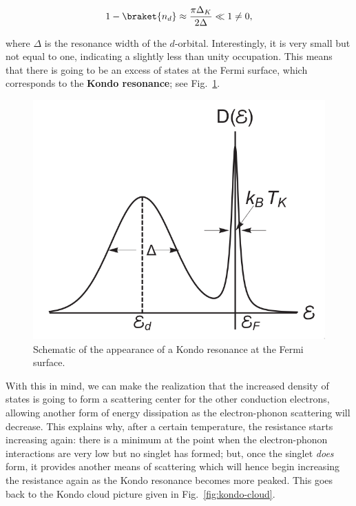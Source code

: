 \begin{equation}
  1 - \braket{n_d} \approx \frac{\pi \Delta_K}{2\Delta} \ll 1 \neq 0,
\end{equation}

where $\Delta$ is the resonance width of the $d$-orbital. Interestingly, it is very small but not equal to one, indicating a slightly less than unity occupation. This means that there is going to be an excess of states at the Fermi surface, which corresponds to the \textbf{Kondo resonance}; see Fig.~\ref{fig:3-variational-kondoresonance}.

\begin{figure}[ht]
  \centering
  \includegraphics[width=0.5\linewidth]{./gfx/kondo-resonance.png}
  \caption{Schematic of the appearance of a Kondo resonance at the Fermi surface.}
  \label{fig:3-variational-kondoresonance}
\end{figure}

With this in mind, we can make the realization that the increased density of states is going to form a scattering center for the other conduction electrons, allowing another form of energy dissipation as the electron-phonon scattering will decrease. This explains why, after a certain temperature, the resistance starts increasing again: there is a minimum at the point when the electron-phonon interactions are very low but no singlet has formed; but, once the singlet \textit{does} form, it provides another means of scattering which will hence begin increasing the resistance again as the Kondo resonance becomes more peaked. This goes back to the Kondo cloud picture given in Fig.~\ref{fig:kondo-cloud}.





